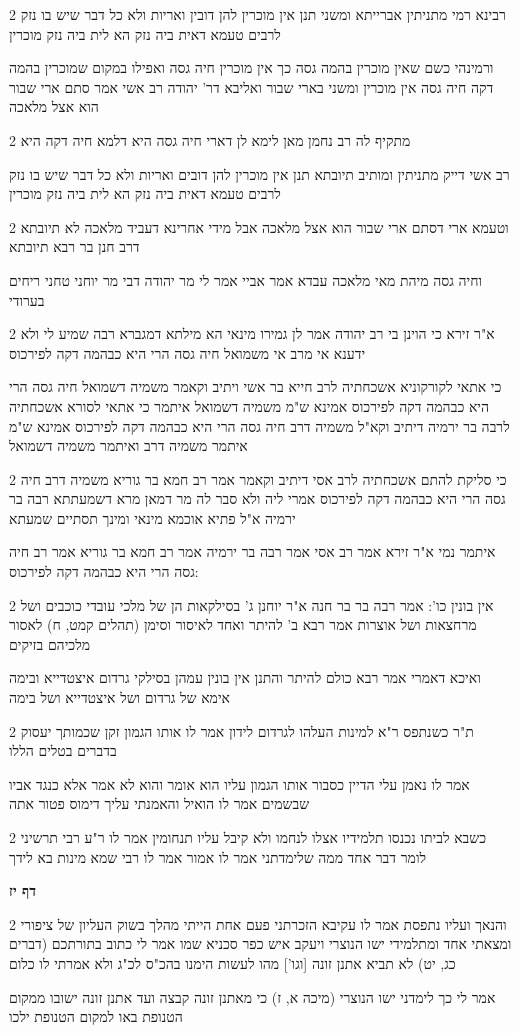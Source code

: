\documentclass[12pt, openany]{book}
\newcommand{\sethebfont}{
\fontsize{10.5pt}{21.0pt} \selectfont
}
\newcommand{\twocol}[1]{
	{\sethebfont \begin{multicols}{2}
			#1
	\end{multicols}}	
}
\newcommand{\sectname}{}
\newcommand{\newsection}[1]{
	\addcontentsline{toc}{section}{#1}
	\renewcommand{\sectname}{#1}	
	\vspace{-\baselineskip}
	\begin{center}
		\textbf{%
\fontsize{16pt}{16pt}\selectfont
			#1}
	\end{center}
	\vspace{-\baselineskip}
	\nopagebreak
}
\begin{document}
\twocol{רבינא רמי מתניתין אברייתא ומשני תנן אין מוכרין להן דובין ואריות ולא כל דבר שיש בו נזק לרבים טעמא דאית ביה נזק הא לית ביה נזק מוכרין
\par ורמינהי כשם שאין מוכרין בהמה גסה כך אין מוכרין חיה גסה ואפילו במקום שמוכרין בהמה דקה חיה גסה אין מוכרין ומשני בארי שבור ואליבא דר' יהודה רב אשי אמר סתם ארי שבור הוא אצל מלאכה}
\twocol{מתקיף לה רב נחמן מאן לימא לן דארי חיה גסה היא דלמא חיה דקה היא
\par רב אשי דייק מתניתין ומותיב תיובתא תנן אין מוכרין להן דובים ואריות ולא כל דבר שיש בו נזק לרבים טעמא דאית ביה נזק הא לית ביה נזק מוכרין}
\twocol{וטעמא ארי דסתם ארי שבור הוא אצל מלאכה אבל מידי אחרינא דעביד מלאכה לא תיובתא דרב חנן בר רבא תיובתא
\par וחיה גסה מיהת מאי מלאכה עבדא אמר אביי אמר לי מר יהודה דבי מר יוחני טחני ריחים בערודי}
\twocol{א"ר זירא כי הוינן בי רב יהודה אמר לן גמירו מינאי הא מילתא דמגברא רבה שמיע לי ולא ידענא אי מרב אי משמואל חיה גסה הרי היא כבהמה דקה לפירכוס
\par כי אתאי לקורקוניא אשכחתיה לרב חייא בר אשי ויתיב וקאמר משמיה דשמואל חיה גסה הרי היא כבהמה דקה לפירכוס אמינא ש"מ משמיה דשמואל איתמר כי אתאי לסורא אשכחתיה לרבה בר ירמיה דיתיב וקא"ל משמיה דרב חיה גסה הרי היא כבהמה דקה לפירכוס אמינא ש"מ איתמר משמיה דרב ואיתמר משמיה דשמואל}
\twocol{כי סליקת להתם אשכחתיה לרב אסי דיתיב וקאמר אמר רב חמא בר גוריא משמיה דרב חיה גסה הרי היא כבהמה דקה לפירכוס אמרי ליה ולא סבר לה מר דמאן מרא דשמעתתא רבה בר ירמיה א"ל פתיא אוכמא מינאי ומינך תסתיים שמעתא
\par איתמר נמי א"ר זירא אמר רב אסי אמר רבה בר ירמיה אמר רב חמא בר גוריא אמר רב חיה גסה הרי היא כבהמה דקה לפירכוס:}
\twocol{אין בונין כו': אמר רבה בר בר חנה א"ר יוחנן ג' בסילקאות הן של מלכי עובדי כוכבים ושל מרחצאות ושל אוצרות אמר רבא ב' להיתר ואחד לאיסור וסימן (תהלים קמט, ח) לאסור מלכיהם בזיקים
\par ואיכא דאמרי אמר רבא כולם להיתר והתנן אין בונין עמהן בסילקי גרדום איצטדייא ובימה אימא של גרדום ושל איצטדייא ושל בימה}
\twocol{ת"ר כשנתפס ר"א למינות העלהו לגרדום לידון אמר לו אותו הגמון זקן שכמותך יעסוק בדברים בטלים הללו
\par אמר לו נאמן עלי הדיין כסבור אותו הגמון עליו הוא אומר והוא לא אמר אלא כנגד אביו שבשמים אמר לו הואיל והאמנתי עליך דימוס פטור אתה}
\twocol{כשבא לביתו נכנסו תלמידיו אצלו לנחמו ולא קיבל עליו תנחומין אמר לו ר"ע רבי תרשיני לומר דבר אחד ממה שלימדתני אמר לו אמור אמר לו רבי שמא מינות בא לידך}
\newsection{דף יז}
\twocol{והנאך ועליו נתפסת אמר לו עקיבא הזכרתני פעם אחת הייתי מהלך בשוק העליון של ציפורי ומצאתי אחד ומתלמידי ישו הנוצרי ויעקב איש כפר סכניא שמו אמר לי כתוב בתורתכם (דברים כג, יט) לא תביא אתנן זונה [וגו'] מהו לעשות הימנו בהכ"ס לכ"ג ולא אמרתי לו כלום
\par אמר לי כך לימדני ישו הנוצרי (מיכה א, ז) כי מאתנן זונה קבצה ועד אתנן זונה ישובו ממקום הטנופת באו למקום הטנופת ילכו}
\end{document}
